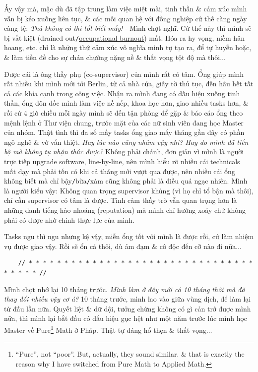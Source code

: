 \documentclass[12pt]{article}
\begin{document}
Ấy vậy mà, mặc dù đã tập trung làm việc miệt mài, tinh thần \& cảm xúc mình vẫn bị kéo xuống liên tục, \& các mối quan hệ với đồng nghiệp cứ thế càng ngày càng tệ: {\it Thà không có thì tốt biết mấy!} - Mình chợt nghĩ. Cứ thế này thì mình sẽ bị vắt kiệt (drained out{\tt/}\href{https://en.wikipedia.org/wiki/Occupational_burnout}{occupational burnout}) mất. Hóa ra hy vọng, niềm hân hoang, etc. chỉ là những thứ cảm xúc vô nghĩa mình tự tạo ra, để tự huyễn hoặc, \& làm tiền đề cho sự chán chường nặng nề \& thất vọng tột độ mà thôi$\ldots$

Được cái là ông thầy phụ (co-supervisor) của mình rất có tâm. Ổng giúp mình rất nhiều khi mình mới tới Berlin, từ cả nhà cửa, giấy tờ thủ tục, đến hầu hết tất cả các khía cạnh trong công việc. Nhận ra mình đang có dấu hiệu xuống tinh thần, ổng đôn đốc mình làm việc nề nếp, khoa học hơn, giao nhiều tasks hơn, \& rồi cứ 4 giờ chiều mỗi ngày mình sẽ đến tận phòng để gặp \& báo cáo ổng theo mệnh lệnh ở Thư viện chung, trước mặt của các nữ sinh viên đang học Master của nhóm. Thật tình thì đa số mấy tasks ổng giao mấy tháng gần đây có phần ngô nghê \& vớ vẩn thiệt. {\it Hay lúc nào cũng nhảm vậy nhỉ? Hay do mình đã tiến bộ mà không tự nhận thức được?} Không phải chảnh, đơn giản vì mình là người trực tiếp upgrade software, line-by-line, nên mình hiểu rõ nhiều cái technicals mất dạy mà phải tốn có khi cả tháng mới vượt qua được, nên nhiều cái ổng không biết mà chỉ bậy{\tt/}bừa{\tt/}xàm cũng không phải là điều quá ngạc nhiên. Mình là người kiểu vậy: Không quan trọng supervisor khủng (vì họ chỉ tổ bận mà thôi), chỉ cần supervisor có tâm là được. Tình cảm thầy trò vẫn quan trọng hơn là những danh tiếng hào nhoáng (reputation) mà mình chỉ hưởng xoáy chứ không phải có được nhờ chính thực lực của mình.

Tasks ngu thì ngu nhưng kệ vậy, miễn ổng tốt với mình là được rồi, cứ làm nhiệm vụ được giao vậy. Rồi sẽ ổn cả thôi, dù ảm đạm \& cô độc đến cỡ nào đi nữa$\ldots$

\begin{verbatim}
	// * * * * * * * * * * * * * * * * * * * * * * * * * * * * * * * * * * * * * //
\end{verbatim}

\noindent
{} Mình chợt nhớ lại 10 tháng trước. {\it Mình làm ở đây mới có 10 tháng thôi mà đã thay đổi nhiều vậy cơ á?} 10 tháng trước, mình lao vào giữa vùng dịch, để làm lại từ đầu lần nữa. Quyết liệt \& dữ dội, tưởng chừng không có gì cản trở được mình nữa, thì mình lại bắt đầu có dấu hiệu gục hệt như một năm trước lúc mình học Master về Pure\footnote{``Pure'', not ``poor''. But, actually, they sound similar. \& that is exactly the reason why I have switched from Pure Math to Applied Math.} Math ở Pháp. Thật tự đáng hổ thẹn \& thất vọng$\ldots$
\end{document}
